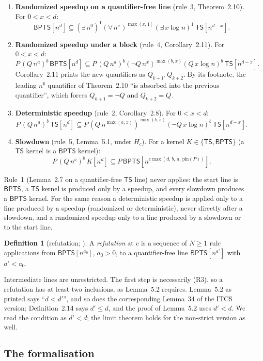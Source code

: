 \documentclass[11pt]{article}
\theoremstyle{definition}
\newtheorem{definition}[theorem]{Definition}
\newcommand{\TS}{\mathsf{TS}}
\newcommand{\BPTS}{\mathsf{BPTS}}
\newcommand{\leanus}{\textunderscore\allowbreak}
\newcommand{\lean}[1]{\ifmmode\text{\ttfamily #1}\else{\ttfamily\let\_\leanus #1}\fi}
\newcommand{\pin}{\mathrm{pin}}
\begin{document}
\begin{enumerate}
\item[(R3)] \textbf{Randomized speedup on a quantifier-free line} (rule~3, Theorem~2.10). For $0<x<d$:
\[ \BPTS[n^d]\subseteq(\exists\,n^0)^1(\forall\,n^x)^{\max(x,1)}(\exists\,x\log n)^1\,\TS[n^{d-x}]. \]
\item[(R4)] \textbf{Randomized speedup under a block} (rule~4, Corollary~2.11). For $0<x<d$:
\[ P\,(Q\,n^{a})^{b}\,\BPTS[n^d]\subseteq P\,(Q\,n^{a})^{b}(\neg Q\,n^{x})^{\max(b,x)}(Q\,x\log n)^{b}\,\TS[n^{d-x}]. \]
Corollary~2.11 prints the new quantifiers as $Q_{k+1},Q_{k+2}$. By its footnote, the leading $n^0$ quantifier of Theorem~2.10 ``is absorbed into the previous quantifier'', which forces $Q_{k+1}=\neg Q$ and $Q_{k+2}=Q$.
\item[(R2)] \textbf{Deterministic speedup} (rule~2, Corollary~2.8). For $0<x<d$:
\[ P\,(Q\,n^{a})^{b}\,\TS[n^d]\subseteq P\,(Q\,n^{\max(a,x)})^{\max(b,x)}(\neg Q\,x\log n)^{b}\,\TS[n^{d-x}]. \]
\item[(S)] \textbf{Slowdown} (rule~5, Lemma~5.1, under $H_c$). For a kernel $K\in\{\TS,\BPTS\}$ (a $\TS$ kernel is a $\BPTS$ kernel):
\[ P\,(Q\,n^{a})^{b}\,K[n^d]\subseteq P\,\BPTS[n^{c\max(d,\,b,\,a,\,\pin(P))}]. \]
\end{enumerate}
Rule~1 (Lemma~2.7 on a quantifier-free $\TS$ line) never applies: the start line is $\BPTS$, a $\TS$ kernel is produced only by a speedup, and every slowdown produces a $\BPTS$ kernel. For the same reason a deterministic speedup is applied only to a line produced by a speedup (randomized or deterministic), never directly after a slowdown, and a randomized speedup only to a line produced by a slowdown or to the start line.

\begin{definition}[refutation; \lean{MWL.Refutes}]\label{def:refutes}
A \emph{refutation} at $c$ is a sequence of $N\ge1$ rule applications from $\BPTS[n^{a_0}]$, $a_0>0$, to a quantifier-free line $\BPTS[n^{a'}]$ with $a'<a_0$.
\end{definition}
Intermediate lines are unrestricted. The first step is necessarily (R3), so a refutation has at least two inclusions, as Lemma~5.2 requires. Lemma~5.2 as printed says ``$d<d'$'', and so does the corresponding Lemma~34 of the ITCS version; Definition~2.14 says $d'\le d$, and the proof of Lemma~5.2 uses $d'<d$. We read the condition as $d'<d$; the limit theorem holds for the non-strict version as well.

\subsection{The formalisation}
\end{document}

